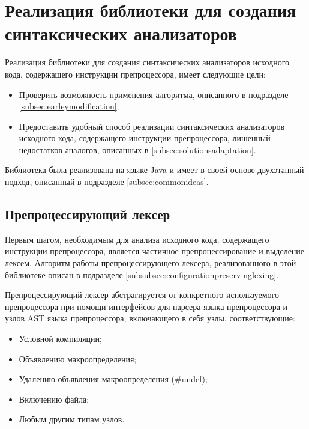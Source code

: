 \clearpage

\section{Реализация библиотеки для создания синтаксических анализаторов}
\label{sec:parserlibimpl}

Реализация библиотеки для создания синтаксических анализаторов исходного кода, содержащего инструкции препроцессора, имеет следующие цели:

\begin{itemize}
\item Проверить возможность применения алгоритма, описанного в подразделе \ref{subsec:earleymodification};
\item Предоставить удобный способ реализации синтаксических анализаторов исходного кода, содержащего инструкции препроцессора, лишенный недостатков аналогов, описанных в \ref{subsec:solutionsadaptation}.
\end{itemize}

Библиотека была реализована на языке Java и имеет в своей основе двухэтапный подход, описанный в подразделе \ref{subsec:commonideas}. 

\subsection{Препроцессирующий лексер}

Первым шагом, необходимым для анализа исходного кода, содержащего инструкции препроцессора, является частичное препроцессирование и выделение лексем. Алгоритм работы препроцессирующего лексера, реализованного в этой библиотеке описан в подразделе \ref{subsubsec:configurationpreservinglexing}.

Препроцессирующий лексер абстрагируется от конкретного используемого препроцессора при помощи интерфейсов для парсера языка препроцессора и узлов AST языка препроцессора, включающего в себя узлы, соответствующие:

\begin{itemize}
\item Условной компиляции;
\item Объявлению макроопределения;
\item Удалению объявления макроопределения (\#undef);
\item Включению файла;
\item Любым другим типам узлов.
\end{itemize}

